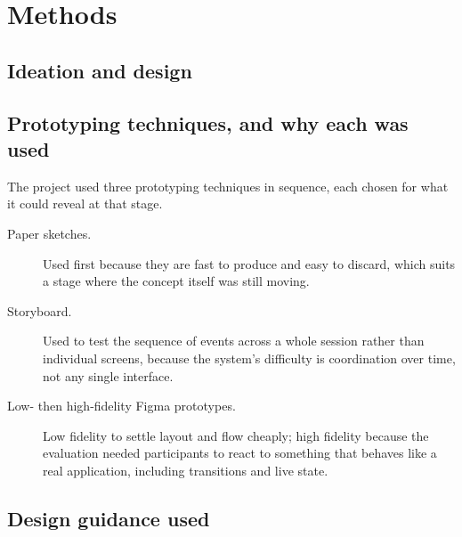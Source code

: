 
\section{Methods}

\subsection{Ideation and design}


\subsection{Prototyping techniques, and why each was used}

The project used three prototyping techniques in sequence, each chosen for what it could reveal at
that stage.

\begin{description}
  \item[Paper sketches.] Used first because they are fast to produce and easy to discard, which
  suits a stage where the concept itself was still moving. 
  \item[Storyboard.] Used to test the sequence of events across a whole session rather than
  individual screens, because the system's difficulty is coordination over time, not any single
  interface. 
  \item[Low- then high-fidelity Figma prototypes.] Low fidelity to settle layout and flow cheaply;
  high fidelity because the evaluation needed participants to react to something that behaves like
  a real application, including transitions and live state. 
\end{description}


\subsection{Design guidance used}

